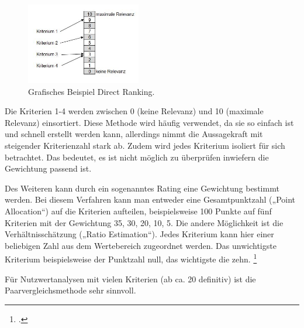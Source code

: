 \begin{figure}[htb]
	\centering
	\includegraphics[width=5cm]{graphics/Direct_Ranking_Methode.JPG}
	\caption[Grafisches Beispiel Direct Ranking]{Grafisches Beispiel Direct Ranking. \footnotemark}
	\label{abb:DirectRanking}
\end{figure}

Die Kriterien 1-4 werden zwischen 0 (keine Relevanz) und 10 (maximale Relevanz) einsortiert. Diese Methode wird häufig verwendet, da sie so einfach ist und schnell erstellt werden kann, allerdings nimmt die Aussagekraft mit steigender Kriterienzahl stark ab. Zudem wird jedes Kriterium isoliert für sich betrachtet. Das bedeutet, es ist nicht möglich zu überprüfen inwiefern die Gewichtung passend ist. \footnotemark
{}

Des Weiteren kann durch ein sogenanntes Rating eine Gewichtung bestimmt werden. Bei diesem Verfahren kann man entweder eine Gesamtpunktzahl („Point Allocation“) auf die Kriterien aufteilen, beispielsweise 100 Punkte auf fünf Kriterien mit der Gewichtung 35, 30, 20, 10, 5. Die andere Möglichkeit ist die Verhältnisschätzung („Ratio Estimation“). Jedes Kriterium kann hier einer beliebigen Zahl aus dem Wertebereich zugeordnet werden. Das unwichtigste Kriterium beispielsweise der Punktzahl null, das wichtigste die zehn. \footcite[Vgl. ][]{PhilippsUniversitatMarburg.2013}

Für Nutzwertanalysen mit vielen Kriterien (ab ca. 20 definitiv) ist die Paarvergleichsmethode sehr sinnvoll.

